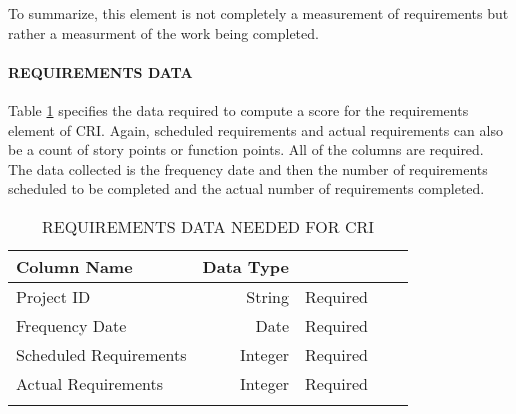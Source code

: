 \documentclass[SDSUThesis.tex]{subfiles}
\begin{document}
            To summarize, this element is not completely a measurement of requirements
            but rather a measurment of the work being completed. 
            
            \paragraph{REQUIREMENTS DATA}
                Table \ref{tab:req} specifies the data required to compute
                a score for the requirements element of CRI.  Again,
                scheduled requirements and actual requirements can also 
                be a count of story points or function points.  All of 
                the columns are required. The data collected is the
                frequency date and then the number of requirements scheduled
                to be completed and the actual number of requirements completed.
            
                \begin{longtable}{@{}l rr rr}
                    \toprule%
                     \centering%
                     {\bfseries Column Name}
                     & {\bfseries Data Type}
                     &  \\
                    
                    \cmidrule[0.4pt](r{0.125em}){1-1}%
                    \cmidrule[0.4pt](lr{0.125em}){2-2}%
                    \cmidrule[0.4pt](l{0.125em}){3-3}%
                    \endhead
                    
                    Project ID & String  & Required \\
                    \myrowcolour%
                    Frequency Date & Date & Required \\
                    Scheduled Requirements & Integer & Required \\
                    \myrowcolour%
                    Actual Requirements & Integer  & Required \\
                    
                    \bottomrule
                    
                    \caption{REQUIREMENTS DATA NEEDED FOR CRI}
                    \label{tab:req}
                \end{longtable}
            
\end{document}
